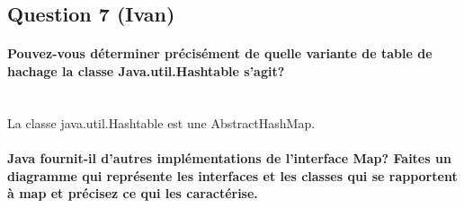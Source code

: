 \documentclass[10pt,a4paper]{article}
\begin{document}
\subsection*{Question 7 (Ivan)}

\paragraph*{Pouvez-vous déterminer précisément de quelle variante de table de hachage la classe Java.util.Hashtable s'agit?}
\\
La classe java.util.Hashtable est une AbstractHashMap. 

\paragraph{Java fournit-il d'autres implémentations de l'interface Map? Faites un diagramme qui représente les interfaces et les classes qui se rapportent à map et précisez ce qui les caractérise.}
\end{document}
